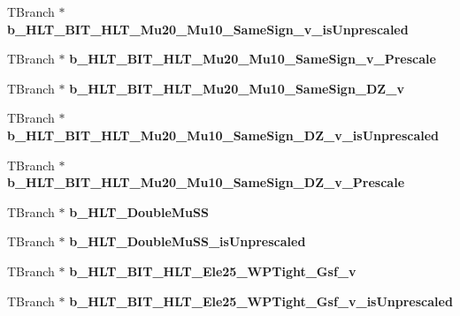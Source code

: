 \begin{DoxyCompactItemize}
T\+Branch $\ast$ {\bfseries b\+\_\+\+H\+L\+T\+\_\+\+B\+I\+T\+\_\+\+H\+L\+T\+\_\+\+Mu20\+\_\+\+Mu10\+\_\+\+Same\+Sign\+\_\+v\+\_\+is\+Unprescaled}
\item 
\hypertarget{classMiniTree_a85e6490d0bc0b0057fbc082476d8f010}{}\label{classMiniTree_a85e6490d0bc0b0057fbc082476d8f010} 
T\+Branch $\ast$ {\bfseries b\+\_\+\+H\+L\+T\+\_\+\+B\+I\+T\+\_\+\+H\+L\+T\+\_\+\+Mu20\+\_\+\+Mu10\+\_\+\+Same\+Sign\+\_\+v\+\_\+\+Prescale}
\item 
\hypertarget{classMiniTree_a098cc477daf43453420ec5d3e044d8cc}{}\label{classMiniTree_a098cc477daf43453420ec5d3e044d8cc} 
T\+Branch $\ast$ {\bfseries b\+\_\+\+H\+L\+T\+\_\+\+B\+I\+T\+\_\+\+H\+L\+T\+\_\+\+Mu20\+\_\+\+Mu10\+\_\+\+Same\+Sign\+\_\+\+D\+Z\+\_\+v}
\item 
\hypertarget{classMiniTree_a518e1b79f754bf26cc62102433823ccf}{}\label{classMiniTree_a518e1b79f754bf26cc62102433823ccf} 
T\+Branch $\ast$ {\bfseries b\+\_\+\+H\+L\+T\+\_\+\+B\+I\+T\+\_\+\+H\+L\+T\+\_\+\+Mu20\+\_\+\+Mu10\+\_\+\+Same\+Sign\+\_\+\+D\+Z\+\_\+v\+\_\+is\+Unprescaled}
\item 
\hypertarget{classMiniTree_a3f60f8f02b9bda5ae0c10db07b64755c}{}\label{classMiniTree_a3f60f8f02b9bda5ae0c10db07b64755c} 
T\+Branch $\ast$ {\bfseries b\+\_\+\+H\+L\+T\+\_\+\+B\+I\+T\+\_\+\+H\+L\+T\+\_\+\+Mu20\+\_\+\+Mu10\+\_\+\+Same\+Sign\+\_\+\+D\+Z\+\_\+v\+\_\+\+Prescale}
\item 
\hypertarget{classMiniTree_a1e3c84fa2b11393fbc87aeed323a9446}{}\label{classMiniTree_a1e3c84fa2b11393fbc87aeed323a9446} 
T\+Branch $\ast$ {\bfseries b\+\_\+\+H\+L\+T\+\_\+\+Double\+Mu\+SS}
\item 
\hypertarget{classMiniTree_ace0ca63cb46f8cbd8fc12a47941c32cd}{}\label{classMiniTree_ace0ca63cb46f8cbd8fc12a47941c32cd} 
T\+Branch $\ast$ {\bfseries b\+\_\+\+H\+L\+T\+\_\+\+Double\+Mu\+S\+S\+\_\+is\+Unprescaled}
\item 
\hypertarget{classMiniTree_a3632925fe5981c12e7b8249c1a109889}{}\label{classMiniTree_a3632925fe5981c12e7b8249c1a109889} 
T\+Branch $\ast$ {\bfseries b\+\_\+\+H\+L\+T\+\_\+\+B\+I\+T\+\_\+\+H\+L\+T\+\_\+\+Ele25\+\_\+\+W\+P\+Tight\+\_\+\+Gsf\+\_\+v}
\item 
\hypertarget{classMiniTree_abac75920ba63347fc180896ccf1bf2fd}{}\label{classMiniTree_abac75920ba63347fc180896ccf1bf2fd} 
T\+Branch $\ast$ {\bfseries b\+\_\+\+H\+L\+T\+\_\+\+B\+I\+T\+\_\+\+H\+L\+T\+\_\+\+Ele25\+\_\+\+W\+P\+Tight\+\_\+\+Gsf\+\_\+v\+\_\+is\+Unprescaled}
\item 
\hypertarget{classMiniTree_a0e05b79679ec63b3470ed2cf653e9c7d}{}\label{classMiniTree_a0e05b79679ec63b3470ed2cf653e9c7d} 

\end{DoxyCompactItemize}
